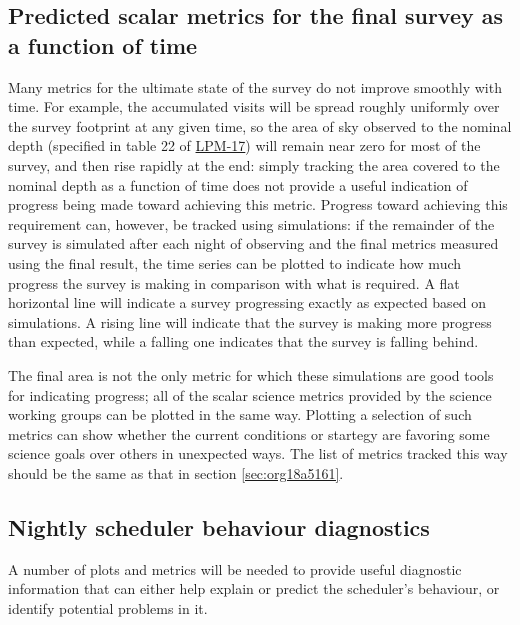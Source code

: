\subsection{Predicted scalar metrics for the final survey as a function of time}
\label{sec:org1fa7be8}
Many metrics for the ultimate state of the survey do not improve smoothly with time.
For example, the accumulated visits will be spread roughly uniformly over the survey footprint at any given time, so the area of sky observed to the nominal depth (specified in table 22 of \href{http://ls.st/lpm-17}{LPM-17}) will remain near zero for most of the survey, and then rise rapidly at the end: simply tracking the area covered to the nominal depth as a function of time does not provide a useful indication of progress being made toward achieving this metric.
Progress toward achieving this requirement can, however, be tracked using simulations: if the remainder of the survey is simulated after each night of observing and the final metrics measured using the final result, the time series can be plotted to indicate how much progress the survey is making in comparison with what is required.
A flat horizontal line will indicate a survey progressing exactly as expected based on simulations.
A rising line will indicate that the survey is making more progress than expected, while a falling one indicates that the survey is falling behind.

The final area is not the only metric for which these simulations are good tools for indicating progress; all of the scalar science metrics provided by the science working groups can be plotted in the same way. Plotting a selection of such metrics can show whether the current conditions or startegy are favoring some science goals over others in unexpected ways.
The list of metrics tracked this way should be the same as that in section \ref{sec:org18a5161}.

\subsection{Nightly scheduler behaviour diagnostics}
\label{sec:org48ec853}
A number of plots and metrics will be needed to provide useful diagnostic information that can either help explain or predict the scheduler's behaviour, or identify potential problems in it.

